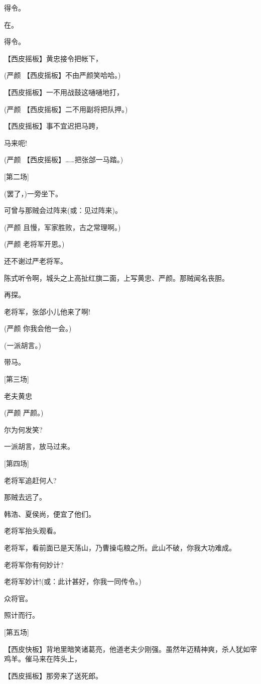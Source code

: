 得令。

在。

得令。

【西皮摇板】黄忠接令把帐下，

(严颜 【西皮摇板】不由严颜笑哈哈。)

【西皮摇板】一不用战鼓这嗵嗵地打，

(严颜 【西皮摇板】二不用副将把队押。)

【西皮摇板】事不宜迟把马跨，

马来呃!

(严颜 【西皮摇板】\ldots{}\ldots{}把张郃一马踏。)

{[}第二场{]}

(罢了，)一旁坐下。

可曾与那贼会过阵来(或：见过阵来)。

(严颜 且慢，军家胜败，古之常理啊。)

(严颜 老将军开恩。)

还不谢过严老将军。

陈式听令啊，城头之上高扯红旗二面，上写黄忠、严颜。那贼闻名丧胆。

再探。

老将军，张郃小儿他来了啊!

(严颜 你我会他一会。)

(一派胡言。)

带马。

{[}第三场{]}

老夫黄忠

(严颜 严颜。)

尔为何发笑?

一派胡言，放马过来。

{[}第四场{]}

老将军追赶何人?

那贼去远了。

韩浩、夏侯尚，便宜了他们。

老将军抬头观看。

老将军，看前面已是天荡山，乃曹操屯粮之所。此山不破，你我大功难成。

老将军你有何妙计?

老将军妙计!(或：此计甚好，你我一同传令。)

众将官。

照计而行。

{[}第五场{]}

【西皮快板】背地里暗笑诸葛亮，他道老夫少刚强。虽然年迈精神爽，杀人犹如宰鸡羊。催马来在阵头上，

【西皮摇板】那旁来了送死郎。

